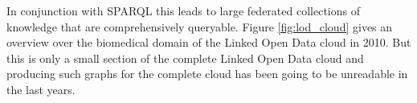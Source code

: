 In conjunction with SPARQL this leads to large federated collections of knowledge that are comprehensively queryable.
Figure \ref{fig:lod_cloud} gives an overview over the biomedical domain of the Linked Open Data cloud in 2010.
But this is only a small section of the complete Linked Open Data cloud and producing such graphs for the complete cloud has been going to be unreadable in the last years.


